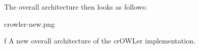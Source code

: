 The overall architecture then looks as follows: 

\midinsert
\picw=7.5cm \cinspic crowler-new.png
\caption/f A new overall architecture of the crOWLer implementation. 
\endinsert



%





